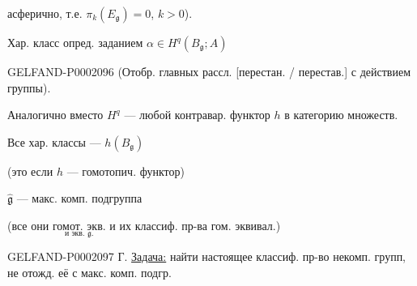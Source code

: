 асферично, т.е. $\pi_k(E_{\mathfrak g})=0$, $k>0$).



Хар. класс опред. заданием $\alpha\in H^q(B_{\mathfrak g};A)$



\begin{GelfandAdjacentEvidence}{GELFAND-P000209}{6}
(Отобр. главных рассл. [перестан. / перестав.] с действием группы).
\end{GelfandAdjacentEvidence}

Аналогично вместо $H^q$ --- любой контравар. функтор $h$ в категорию множеств.



Все хар. классы --- $h(B_{\mathfrak g})$



(это если $h$ --- гомотопич. функтор)



$\hat{\mathfrak g}$ --- макс. комп. подгруппа



(все они $\underset{\text{и экв. }\mathfrak g.}{\text{гомот. экв.}}$ и их классиф. пр-ва гом. эквивал.)



\begin{GelfandAdjacentEvidence}{GELFAND-P000209}{7}
Г. \underline{Задача:} найти настоящее классиф. пр-во некомп. групп,
не отожд. её с макс. комп. подгр.






\end{GelfandAdjacentEvidence}



